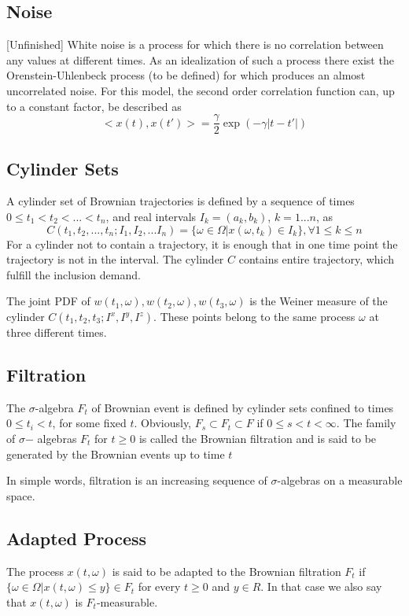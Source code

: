 \documentclass[12pt]{report}
\begin{document}
\tableofcontents

\subsection{Noise}[Unfinished]
White noise is a process for which there is no correlation between any values at different times. As an idealization of such a process there exist the Orenstein-Uhlenbeck process (to be defined) for which produces an almost uncorrelated noise. For this model, the second order correlation function can, up to a constant factor, be described as 
\begin{equation*}
<x(t),x(t')>= \frac{\gamma}{2}\exp(-\gamma|t-t'|)
\end{equation*}

\subsection{Cylinder Sets}
A cylinder set of Brownian trajectories is defined by a sequence of times $0\leq t_1<t_2<...<t_n$, and real intervals $I_k=(a_k,b_k)$, $k=1...n$, as 
\begin{equation*}
C(t_1,t_2,...,t_n;I_1,I_2,...I_n)=\{\omega\in \Omega|x(\omega,t_k)\in I_k\},\forall 1\leq k \leq n
\end{equation*}
For a cylinder not to contain a trajectory, it is enough that in one time point the trajectory is not in the interval.
The cylinder $C$ contains entire trajectory, which fulfill the inclusion demand. 

The joint PDF of $w(t_1,\omega),w(t_2,\omega),w(t_3,\omega)$ is the Weiner measure of the cylinder $C(t_1,t_2,t_3;I^x,I^y,I^z)$. These points belong to the same process $\omega$ at three different times. 

\subsection{Filtration}
The $\sigma$-algebra $F_t$ of Brownian event is defined by cylinder
sets confined to times $0\leq t_i < t$, for some fixed $t$. Obviously, $F_s \subset F_t \subset F$ if $0\leq s < t <\infty$. The family of $\sigma$− algebras $F_t$ for $t \geq 0$ is called the Brownian filtration and is said to be generated by the Brownian events up to time $t$

In simple words, filtration is an increasing sequence of $\sigma$-algebras on a measurable space. 

\subsection{Adapted Process}
The process $x(t,\omega)$ is said to be adapted
to the Brownian filtration $F_t$ if $\{\omega\in\Omega|x(t,\omega) \leq y\} \in F_t$ for every $t \geq 0$ and
$y\in R$. In that case we also say that $x(t, \omega)$ is $F_t$-measurable.
\end{document}
